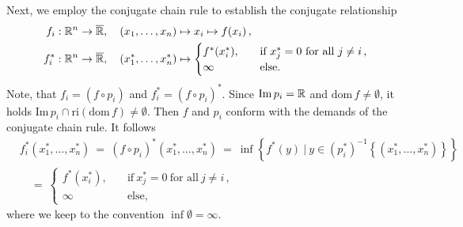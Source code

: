 \begin{example*}
  Next, we employ the conjugate chain rule to establish the conjugate relationship 
  \begin{align*}
    f_i&:\R^n\to \overline{\R}
    ,
    \quad
    (x_1,\ldots,x_n)\mapsto x_i \mapsto f(x_i)
    \,,
    \\
    f^*_i&:\R^n\to \overline{\R}
    ,
    \quad
    (x^*_1,\ldots,x^*_n)\mapsto 
    \begin{cases}
      f^*(x_i^*),
      \quad
      &\text{if}\ 
      x_j^*=0\ \text{for all}\ j\neq i\,,
      \\
      \infty
      \quad
      &\text{else.}
    \end{cases}
  \end{align*}
  Note, that 
  $
    f_i
    =
    (f\circ p_i)
  $
  and
  $
    f^*_i
    =
    (f\circ p_i)^*
  $.
  Since 
  $
    \mathrm{Im}\,p_i=\mathbb{R}
  $
  and 
  $
    \mathrm{dom}\, f
    \neq
    \emptyset
  $,
  it holds
  $
    \mathrm{Im}\, p_i
    \cap
    \mathrm{ri}(
    \mathrm{dom}\, f
    )
    \neq
    \emptyset
  $.
  Then $f$ and $p_i$ conform with the demands of the conjugate chain rule.
  It follows
  \begin{align*}
    &f_i^*
    (x^*_1,\ldots,x^*_n) 
    \ 
    =
    \ 
    (f\circ p_i)^*
    (x^*_1,\ldots,x^*_n) 
    \ =
    \ 
    \inf
    \left\{ 
    f^*(y)
    \ 
    |
    \ 
    y\in 
    (p_i^*)^{-1}
    \left\{ 
    (x_1^*,\ldots,x_n^*)
    \right\}
    \right\}
    \\
    &\quad=
    \ 
    \begin{cases}
      f^*(x_i^*),
      \quad
      &\text{if}\ 
      x_j^*=0\ \text{for all}\ j\neq i\,,
      \\
      \infty
      \quad
      &\text{else,}
    \end{cases}
  \end{align*}
  where we keep to the convention $\inf\emptyset=\infty$.
\end{example*}






